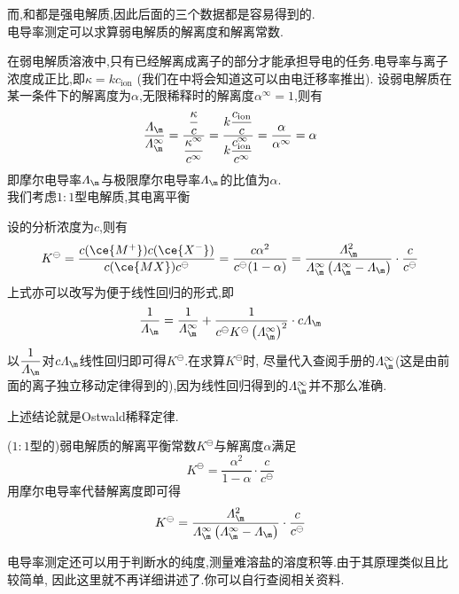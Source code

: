 \documentclass{ctexart}
\begin{document}
而,和都是强电解质,因此后面的三个数据都是容易得到的.\vspace{4pt}\\
\indent 电导率测定可以求算弱电解质的解离度和解离常数.
\begin{derivation}
    在弱电解质溶液中,只有已经解离成离子的部分才能承担导电的任务.电导率与离子浓度成正比,即$\kappa=kc_{\text{ion}}$%
    (我们在中将会知道这可以由电迁移率推出).%
    设弱电解质在某一条件下的解离度为$\alpha$,无限稀释时的解离度$\alpha^\infty=1$,则有
    \[\dfrac{\varLambda_\m}{\varLambda_\m^\infty}
    =\dfrac{\dfrac{\kappa}{c}}{\dfrac{\kappa^\infty}{c^\infty}}
    =\dfrac{k\dfrac{c_{\text{ion}}}{c}}{k\dfrac{c_{\text{ion}}^\infty}{c^\infty}}
    =\dfrac{\alpha}{\alpha^\infty}=\alpha\]
    即摩尔电导率$\varLambda_\m$与极限摩尔电导率$\varLambda_\m$的比值为$\alpha$.\\
    我们考虑$1:1$型电解质,其电离平衡
    \begin{tightcenter}
    \end{tightcenter}
    设的分析浓度为$c$,则有
    \[K^\ominus=\dfrac{c(\ce{M^+})c(\ce{X^-})}{c(\ce{MX})c^\ominus}
    =\dfrac{c\alpha^2}{c^\ominus(1-\alpha)}
    =\dfrac{\varLambda_\m^2}{\varLambda_\m^\infty\left(\varLambda_\m^\infty-\varLambda_\m\right)}\cdot\dfrac{c}{c^\ominus}\]
    上式亦可以改写为便于线性回归的形式,即
    \[\dfrac{1}{\varLambda_\m}=\dfrac{1}{\varLambda_\m^\infty}+\dfrac{1}{c^\ominus K^\ominus\left(\varLambda_\m^\infty\right)^2}\cdot c\varLambda_\m\]
    以$\dfrac{1}{\varLambda_\m}$对$c\varLambda_\m$线性回归即可得$K^\ominus$.在求算$K^\ominus$时,%
    尽量代入查阅手册的$\varLambda_\m^\infty$(这是由前面的离子独立移动定律得到的),因为线性回归得到的$\varLambda_\m^\infty$并不那么准确.
\end{derivation}
上述结论就是Ostwald稀释定律.
\begin{theorem}[6A.1.6 Ostwald稀释定律]
    ($1:1$型的)弱电解质的解离平衡常数$K^\ominus$与解离度$\alpha$满足
    \[K^\ominus=\dfrac{\alpha^2}{1-\alpha}\cdot\dfrac{c}{c^\ominus}\]
    用摩尔电导率代替解离度即可得
    \[K^\ominus=\dfrac{\varLambda_\m^2}{\varLambda_\m^\infty\left(\varLambda_\m^\infty-\varLambda_\m\right)}\cdot\dfrac{c}{c^\ominus}\]

\end{theorem}
电导率测定还可以用于判断水的纯度,测量难溶盐的溶度积等.由于其原理类似且比较简单,%
因此这里就不再详细讲述了.你可以自行查阅相关资料.\vspace{12pt}\\
\end{document}
